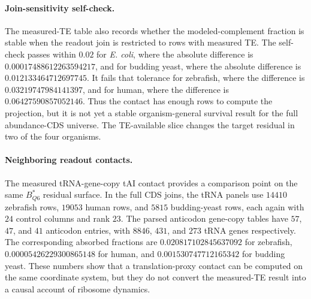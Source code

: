 \paragraph{Join-sensitivity self-check.}
The measured-TE table also records whether the modeled-complement fraction is stable when the readout join is restricted to rows with measured TE.  The self-check passes within $0.02$ for \emph{E. coli}, where the absolute difference is $0.00017488612263594217$, and for budding yeast, where the absolute difference is $0.012133464712697745$.  It fails that tolerance for zebrafish, where the difference is $0.03219747984141397$, and for human, where the difference is $0.06427590857052146$.  Thus the contact has enough rows to compute the projection, but it is not yet a stable organism-general survival result for the full abundance-CDS universe.  The TE-available slice changes the target residual in two of the four organisms.

\paragraph{Neighboring readout contacts.}
The measured tRNA-gene-copy tAI contact provides a comparison point on the same $B^{*}_{Q6}$ residual surface.  In the full CDS joins, the tRNA panels use $14410$ zebrafish rows, $19053$ human rows, and $5815$ budding-yeast rows, each again with $24$ control columns and rank $23$.  The parsed anticodon gene-copy tables have $57$, $47$, and $41$ anticodon entries, with $8846$, $431$, and $273$ tRNA genes respectively.  The corresponding absorbed fractions are $0.020817102845637092$ for zebrafish, $0.00005426229300865148$ for human, and $0.001530747712165342$ for budding yeast.  These numbers show that a translation-proxy contact can be computed on the same coordinate system, but they do not convert the measured-TE result into a causal account of ribosome dynamics.

